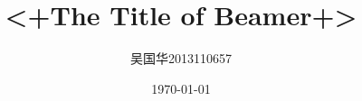 \documentclass{beamer}
\title{<+The Title of Beamer+>}
\author{吴国华\quad{}2013110657}
\institute[BUPT]{
  计算机学院\\
  智能科学与技术
}
\date{\today}
\begin{document}
\begin{frame}
  \titlepage
\end{frame}
\end{document}
